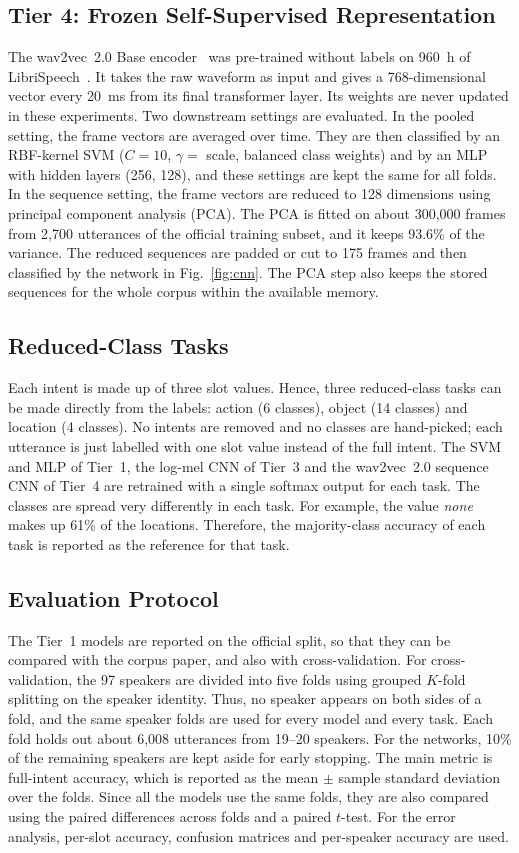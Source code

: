 \documentclass[conference]{IEEEtran}
\begin{document}
\subsection{Tier 4: Frozen Self-Supervised Representation}
The wav2vec~2.0 Base encoder~\cite{baevski2020wav2vec2} was pre-trained without labels on 960~h of LibriSpeech~\cite{panayotov2015librispeech}. It takes the raw waveform as input and gives a 768-dimensional vector every 20~ms from its final transformer layer. Its weights are never updated in these experiments. Two downstream settings are evaluated. In the pooled setting, the frame vectors are averaged over time. They are then classified by an RBF-kernel SVM ($C = 10$, $\gamma = $ scale, balanced class weights) and by an MLP with hidden layers (256, 128), and these settings are kept the same for all folds. In the sequence setting, the frame vectors are reduced to 128 dimensions using principal component analysis (PCA). The PCA is fitted on about 300,000 frames from 2,700 utterances of the official training subset, and it keeps 93.6\% of the variance. The reduced sequences are padded or cut to 175 frames and then classified by the network in Fig.~\ref{fig:cnn}. The PCA step also keeps the stored sequences for the whole corpus within the available memory.

\subsection{Reduced-Class Tasks}\label{sec:slots}
Each intent is made up of three slot values. Hence, three reduced-class tasks can be made directly from the labels: action (6 classes), object (14 classes) and location (4 classes). No intents are removed and no classes are hand-picked; each utterance is just labelled with one slot value instead of the full intent. The SVM and MLP of Tier~1, the log-mel CNN of Tier~3 and the wav2vec~2.0 sequence CNN of Tier~4 are retrained with a single softmax output for each task. The classes are spread very differently in each task. For example, the value \emph{none} makes up 61\% of the locations. Therefore, the majority-class accuracy of each task is reported as the reference for that task.

\subsection{Evaluation Protocol}\label{sec:protocol}
The Tier~1 models are reported on the official split, so that they can be compared with the corpus paper, and also with cross-validation. For cross-validation, the 97 speakers are divided into five folds using grouped $K$-fold splitting on the speaker identity. Thus, no speaker appears on both sides of a fold, and the same speaker folds are used for every model and every task. Each fold holds out about 6,008 utterances from 19--20 speakers. For the networks, 10\% of the remaining speakers are kept aside for early stopping. The main metric is full-intent accuracy, which is reported as the mean $\pm$ sample standard deviation over the folds. Since all the models use the same folds, they are also compared using the paired differences across folds and a paired $t$-test. For the error analysis, per-slot accuracy, confusion matrices and per-speaker accuracy are used.
\end{document}

